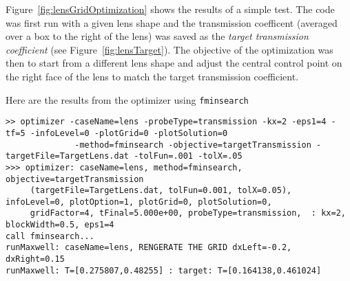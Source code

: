 \documentclass[11pt]{article}
\begin{document}
Figure~\ref{fig:lensGridOptimization} shows the results of a simple test.
The code was first run with a given lens shape and the transmission coefficent (averaged over a box to the right of the lens)
was saved as the {\em target transmission coefficient} (see Figure~\ref{fig:lensTarget}). 
The objective of the optimization was then to start from a different lens shape and adjust the
central control point on the right face of the lens to match the target transmission coefficient. 

\medskip\noindent
Here are the results from the optimizer using {\tt fminsearch}
{\scriptsize
\begin{verbatim}
>> optimizer -caseName=lens -probeType=transmission -kx=2 -eps1=4 -tf=5 -infoLevel=0 -plotGrid=0 -plotSolution=0
              -method=fminsearch -objective=targetTransmission -targetFile=TargetLens.dat -tolFun=.001 -tolX=.05
>>> optimizer: caseName=lens, method=fminsearch, objective=targetTransmission 
     (targetFile=TargetLens.dat, tolFun=0.001, tolX=0.05), infoLevel=0, plotOption=1, plotGrid=0, plotSolution=0,
     gridFactor=4, tFinal=5.000e+00, probeType=transmission,  : kx=2, blockWidth=0.5, eps1=4
call fminsearch...
runMaxwell: caseName=lens, RENGERATE THE GRID dxLeft=-0.2, dxRight=0.15
runMaxwell: T=[0.275807,0.48255] : target: T=[0.164138,0.461024]
 

\end{verbatim}}
\end{document}
